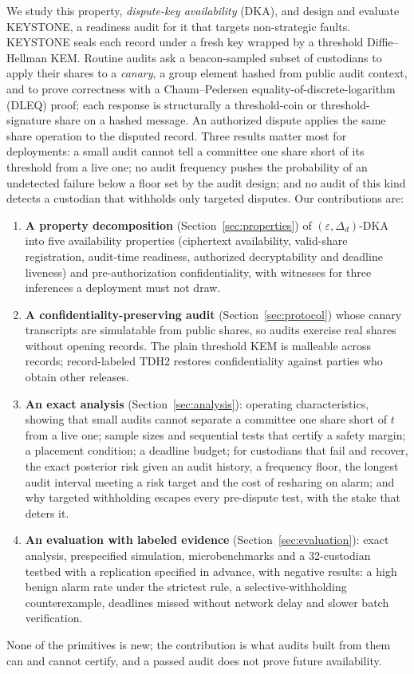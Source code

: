 \documentclass[Crown,sagev]{sagej}
\theoremstyle{plain}
\theoremstyle{definition}
\theoremstyle{remark}
\begin{document}
We study this property, \emph{dispute-key availability} (DKA), and design and evaluate KEYSTONE, a readiness audit for it that targets non-strategic faults. KEYSTONE seals each record under a fresh key wrapped by a threshold Diffie--Hellman KEM. Routine audits ask a beacon-sampled subset of custodians to apply their shares to a \emph{canary}, a group element hashed from public audit context, and to prove correctness with a Chaum--Pedersen equality-of-discrete-logarithm (DLEQ) proof; each response is structurally a threshold-coin or threshold-signature share on a hashed message\cite{cachin2005constantinople,boldyreva2003threshold}. An authorized dispute applies the same share operation to the disputed record. Three results matter most for deployments: a small audit cannot tell a committee one share short of its threshold from a live one; no audit frequency pushes the probability of an undetected failure below a floor set by the audit design; and no audit of this kind detects a custodian that withholds only targeted disputes. Our contributions are:
\begin{enumerate}
  \item \textbf{A property decomposition} (Section~\ref{sec:properties}) of $(\varepsilon,\Delta_d)$-DKA into five availability properties (ciphertext availability, valid-share registration, audit-time readiness, authorized decryptability and deadline liveness) and pre-authorization confidentiality, with witnesses for three inferences a deployment must not draw.
  \item \textbf{A confidentiality-preserving audit} (Section~\ref{sec:protocol}) whose canary transcripts are simulatable from public shares, so audits exercise real shares without opening records. The plain threshold KEM is malleable across records; record-labeled TDH2 restores confidentiality against parties who obtain other releases.
  \item \textbf{An exact analysis} (Section~\ref{sec:analysis}): operating characteristics, showing that small audits cannot separate a committee one share short of $t$ from a live one; sample sizes and sequential tests that certify a safety margin; a placement condition; a deadline budget; for custodians that fail and recover, the exact posterior risk given an audit history, a frequency floor, the longest audit interval meeting a risk target and the cost of resharing on alarm; and why targeted withholding escapes every pre-dispute test, with the stake that deters it.
  \item \textbf{An evaluation with labeled evidence} (Section~\ref{sec:evaluation}): exact analysis, prespecified simulation, microbenchmarks and a 32-custodian testbed with a replication specified in advance, with negative results: a high benign alarm rate under the strictest rule, a selective-withholding counterexample, deadlines missed without network delay and slower batch verification.
\end{enumerate}
None of the primitives is new; the contribution is what audits built from them can and cannot certify, and a passed audit does not prove future availability.
\end{document}
